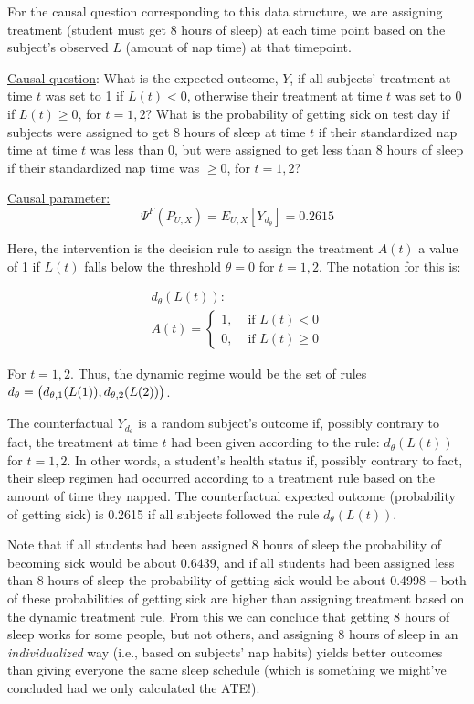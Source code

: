 \documentclass[answers]{exam}
\begin{document}
For the causal question corresponding to this data structure, we are assigning treatment (student must get 8 hours of sleep) at each time point based on the subject's observed $L$ (amount of nap time) at that timepoint.

\underline{Causal question}: What is the expected outcome, $Y$, if all subjects' treatment at time $t$ was set to 1 if $L(t) < 0$, otherwise their treatment at time $t$ was set to 0 if $L(t) \geq 0$, for $t = 1,2$? What is the probability of getting sick on test day if subjects were assigned to get 8 hours of sleep at time $t$ if their standardized nap time at time $t$ was less than 0, but were assigned to get less than 8 hours of sleep if their standardized nap time was $\geq 0$, for $t = 1,2$?


\underline{Causal parameter:} 
\[
\Psi^F(P_{U,X}) = E_{U,X}[Y_{d_\theta}] = 0.2615
\]

Here, the intervention is the decision rule to assign the treatment $A(t)$ a value of 1 if $L(t)$ falls below the threshold $\theta = 0$ for $t = 1,2$. The notation for this is:

\begin{align*}
d_\theta(L(t)): \\
A(t) = 
    \begin{cases}
      1, & \text{ if } L(t) < 0 \\
      0, & \text{ if } L(t) \geq 0
    \end{cases}
\end{align*}

For $t = 1,2$. Thus, the dynamic regime would be the set of rules $d_\theta = \big{(}d_{\theta,1}(L(1)), d_{\theta,2}(L(2))\big{)}$.

The counterfactual $Y_{d_\theta}$ is a random subject's outcome if, possibly contrary to fact, the treatment at time $t$ had been given according to the rule: $d_\theta(L(t))$ for $t = 1,2$. In other words, a student's health status if, possibly contrary to fact, their sleep regimen had occurred according to a treatment rule based on the amount of time they napped. The counterfactual expected outcome (probability of getting sick) is 0.2615 if all subjects followed the rule $d_\theta(L(t))$. 

Note that if all students had been assigned 8 hours of sleep the probability of becoming sick would be about 0.6439, and if all students had been assigned less than 8 hours of sleep the probability of getting sick would be about 0.4998 -- both of these probabilities of getting sick are higher than assigning treatment based on the dynamic treatment rule. From this we can conclude that getting 8 hours of sleep works for some people, but not others, and assigning 8 hours of sleep in an \textit{individualized} way (i.e., based on subjects' nap habits) yields better outcomes than giving everyone the same sleep schedule (which is something we might've concluded had we only calculated the ATE!). 
\end{document}
